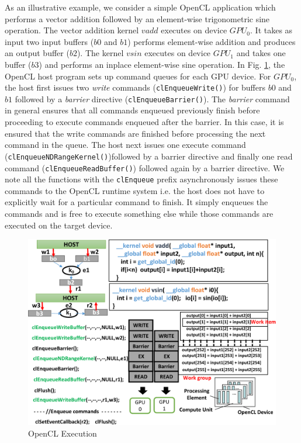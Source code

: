 	\par As an illustrative example, we consider a simple OpenCL application which performs a vector addition followed by an element-wise trigonometric sine operation. The vector addition kernel $vadd$ executes on device $GPU_0$. It takes as input two input buffers ($b0$ and $b1$) performs element-wise addition and produces an output buffer ($b2$). The kernel $vsin$ executes on device $GPU_1$ and takes one buffer ($b3$) and performs an inplace element-wise sine operation. In Fig. \ref{fig:OpenCLArch}, the OpenCL host program sets up command queues for each GPU device. For $GPU_0$, the host first issues two {\em write} commands ({\tt clEnqueueWrite()}) for buffers $b0$ and $b1$ followed by a {\em barrier} directive ({\tt clEnqueueBarrier()}). The {\em barrier} command in general ensures that all commands enqueued previously finish before proceeding to execute commands enqueued after the barrier. In this case, it is ensured that the write commands are finished before processing the next command in the queue. The host next issues one execute command ({\tt clEnqueueNDRangeKernel()})followed by a barrier directive and finally one read command ({\tt clEnqueueReadBuffer()}) followed again by a barrier directive. We note all the functions with the {\tt clEnqueue} prefix asynchronously issues these commands to the OpenCL runtime system i.e. the host does not have to explicitly wait for a particular command to finish. It simply enqueues the commands and is free to execute  something else while those commands are executed on the target device. 
	\begin{figure}[ht]  
		\centering
		\includegraphics[scale=0.47]{Pictures/OpenCLBackground.pdf}
		\caption{OpenCL Execution \label{fig:OpenCLArch}}
	\end{figure}
